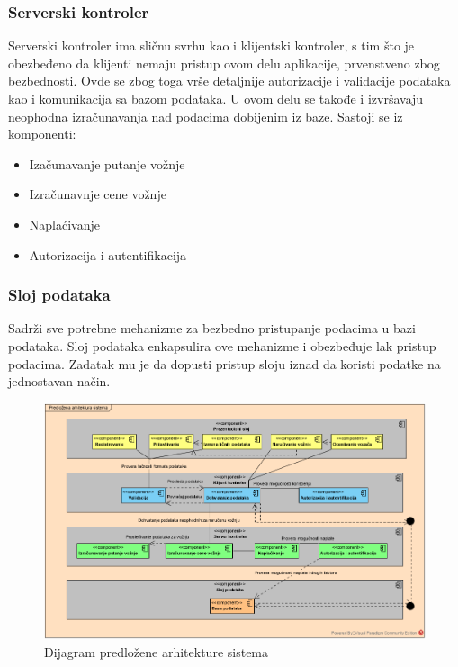 \subsubsection{\bfseries Serverski kontroler}

Serverski kontroler ima sličnu svrhu kao i klijentski kontroler, s tim što je obezbeđeno da klijenti nemaju pristup ovom delu aplikacije, prvenstveno zbog bezbednosti. Ovde se zbog toga vrše detaljnije autorizacije i validacije podataka kao i komunikacija sa bazom podataka. U ovom delu se takođe i izvršavaju neophodna izračunavanja nad podacima dobijenim iz baze.
\newline
Sastoji se iz komponenti:
\begin{itemize}
    \item Izačunavanje putanje vožnje
    \item Izračunavnje cene vožnje
    \item Naplaćivanje
    \item Autorizacija i autentifikacija
\end{itemize}
\subsubsection{\bfseries Sloj podataka}
Sadrži sve potrebne mehanizme za bezbedno pristupanje podacima u bazi podataka. Sloj podataka enkapsulira ove mehanizme i obezbeđuje lak pristup podacima. Zadatak mu je da dopusti pristup sloju iznad da koristi podatke na jednostavan način.

\begin{figure}[H]
\includegraphics[scale = 0.70]{Slike/Arhitektura.png}
    \caption{Dijagram predložene arhitekture sistema}
\label{fig:Predložena arhitektura sistema}
\end{figure}

\newpage